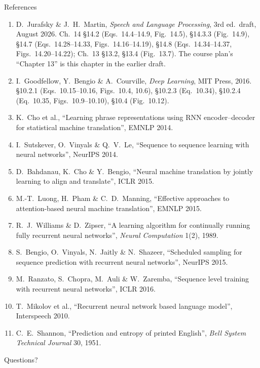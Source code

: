 \documentclass[aspectratio=169, 11pt]{beamer}
\begin{document}
\begin{frame}[allowframebreaks]{References}
  \vspace{0.3em}
  {\scriptsize
  \begin{enumerate}\itemsep0.30em
    \item D.\ Jurafsky \& J.\ H.\ Martin, \emph{Speech and Language
          Processing}, 3rd ed.\ draft, August 2026. Ch.~14 \S14.2
          (Eqs.~14.4--14.9, Fig.~14.5), \S14.3.3 (Fig.~14.9), \S14.7
          (Eqs.~14.28--14.33, Figs.~14.16--14.19), \S14.8
          (Eqs.~14.34--14.37, Figs.~14.20--14.22); Ch.~13 \S13.2, \S13.4
          (Fig.~13.7). The course plan's ``Chapter 13'' is this chapter
          in the earlier draft.
    \item I.\ Goodfellow, Y.\ Bengio \& A.\ Courville, \emph{Deep
          Learning}, MIT Press, 2016. \S10.2.1 (Eqs.~10.15--10.16,
          Figs.~10.4, 10.6), \S10.2.3 (Eq.~10.34), \S10.2.4 (Eq.~10.35,
          Figs.~10.9--10.10), \S10.4 (Fig.~10.12).
    \item K.\ Cho et al., ``Learning phrase representations using RNN
          encoder--decoder for statistical machine translation'',
          EMNLP 2014.
    \item I.\ Sutskever, O.\ Vinyals \& Q.\ V.\ Le, ``Sequence to sequence
          learning with neural networks'', NeurIPS 2014.
    \item D.\ Bahdanau, K.\ Cho \& Y.\ Bengio, ``Neural machine
          translation by jointly learning to align and translate'',
          ICLR 2015.
    \item M.-T.\ Luong, H.\ Pham \& C.\ D.\ Manning, ``Effective
          approaches to attention-based neural machine translation'',
          EMNLP 2015.
    \item R.\ J.\ Williams \& D.\ Zipser, ``A learning algorithm for
          continually running fully recurrent neural networks'',
          \emph{Neural Computation} 1(2), 1989.
    \item S.\ Bengio, O.\ Vinyals, N.\ Jaitly \& N.\ Shazeer, ``Scheduled
          sampling for sequence prediction with recurrent neural
          networks'', NeurIPS 2015.
    \item M.\ Ranzato, S.\ Chopra, M.\ Auli \& W.\ Zaremba, ``Sequence
          level training with recurrent neural networks'', ICLR 2016.
    \item T.\ Mikolov et al., ``Recurrent neural network based language
          model'', Interspeech 2010.
    \item C.\ E.\ Shannon, ``Prediction and entropy of printed English'',
          \emph{Bell System Technical Journal} 30, 1951.
  \end{enumerate}}
\end{frame}

\begin{frame}[standout]
  Questions?
\end{frame}
\end{document}
